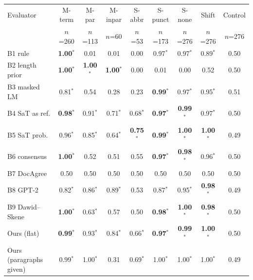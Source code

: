 \begin{tabular}{lcccccccc}
\toprule
Evaluator & M-term & M-par & M-inpar & S-abbr & S-punct & S-none & Shift & Control \\
 & {\tiny $n$=260} & {\tiny $n$=113} & {\tiny $n$=60} & {\tiny $n$=53} & {\tiny $n$=173} & {\tiny $n$=276} & {\tiny $n$=276} & {\tiny $n$=276} \\
\midrule
B1 rule & \textbf{1.00}$^*$ & 0.01 & 0.01 & 0.00 & 0.97$^*$ & 0.97$^*$ & 0.89$^*$ & 0.50 \\
B2 length prior & \textbf{1.00}$^*$ & \textbf{1.00}$^*$ & \textbf{1.00}$^*$ & 0.00 & 0.01 & 0.00 & 0.52 & 0.50 \\
B3 masked LM & 0.81$^*$ & 0.54 & 0.28 & 0.23 & \textbf{0.99}$^*$ & 0.97$^*$ & 0.95$^*$ & 0.51 \\
B4 SaT as ref. & \textbf{0.98}$^*$ & 0.91$^*$ & 0.71$^*$ & 0.68$^*$ & \textbf{0.97}$^*$ & \textbf{0.99}$^*$ & 0.97$^*$ & 0.50 \\
B5 SaT prob. & 0.96$^*$ & 0.85$^*$ & 0.64$^*$ & \textbf{0.75}$^*$ & \textbf{0.99}$^*$ & \textbf{1.00}$^*$ & \textbf{1.00}$^*$ & 0.49 \\
B6 consensus & \textbf{1.00}$^*$ & 0.52 & 0.51 & 0.55 & \textbf{0.97}$^*$ & \textbf{0.98}$^*$ & 0.96$^*$ & 0.50 \\
B7 DocAgree & 0.50 & 0.50 & 0.50 & 0.50 & 0.50 & 0.50 & 0.50 & 0.50 \\
B8 GPT-2 & 0.82$^*$ & 0.86$^*$ & 0.89$^*$ & 0.53 & 0.87$^*$ & 0.95$^*$ & \textbf{0.98}$^*$ & 0.49 \\
B9 Dawid--Skene & \textbf{1.00}$^*$ & 0.63$^*$ & 0.57 & 0.50 & \textbf{0.98}$^*$ & \textbf{1.00}$^*$ & \textbf{0.98}$^*$ & 0.50 \\
Ours (flat) & \textbf{0.99}$^*$ & 0.93$^*$ & 0.84$^*$ & 0.66$^*$ & \textbf{0.97}$^*$ & \textbf{0.99}$^*$ & \textbf{1.00}$^*$ & 0.50 \\
\midrule
Ours (paragraphs given) & 0.99$^*$ & 1.00$^*$ & 0.31 & 0.69$^*$ & 1.00$^*$ & 1.00$^*$ & 1.00$^*$ & 0.49 \\
\bottomrule
\end{tabular}
